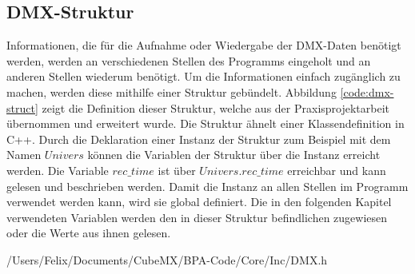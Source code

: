 
\subsection{DMX-Struktur}
\label{sec:dmx_struct}
Informationen, die für die Aufnahme oder Wiedergabe der DMX-Daten benötigt werden, werden an verschiedenen Stellen des Programms eingeholt und an anderen Stellen wiederum benötigt. Um die Informationen einfach zugänglich zu machen, werden diese mithilfe einer Struktur gebündelt. Abbildung \ref{code:dmx-struct} zeigt die Definition dieser Struktur, welche aus der Praxisprojektarbeit übernommen und erweitert wurde. Die Struktur ähnelt einer Klassendefinition in C++. Durch die Deklaration einer Instanz der Struktur zum Beispiel mit dem Namen $Univers$ können die Variablen der Struktur über die Instanz erreicht werden. Die Variable $rec\_time$ ist über $Univers.rec\_time$ erreichbar und kann gelesen und beschrieben werden. Damit die Instanz an allen Stellen im Programm verwendet werden kann, wird sie global definiert. Die in den folgenden Kapitel verwendeten Variablen werden den in dieser Struktur befindlichen zugewiesen oder die Werte aus ihnen gelesen.

{/Users/Felix/Documents/CubeMX/BPA-Code/Core/Inc/DMX.h}